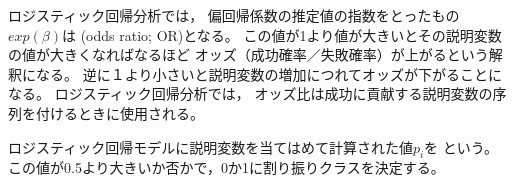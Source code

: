 {
  ロジスティック回帰分析では，
  偏回帰係数の推定値の指数をとったもの$exp(\beta)$は
  (odds ratio; OR)となる。
  この値が1より値が大きいとその説明変数の値が大きくなればなるほど
  オッズ（成功確率／失敗確率）が上がるという解釈になる。
  逆に１より小さいと説明変数の増加につれてオッズが下がることになる。
  ロジスティック回帰分析では，
  オッズ比は成功に貢献する説明変数の序列を付けるときに使用される。
}

{
  ロジスティック回帰モデルに説明変数を当てはめて計算された値$p_i$を
  という。
  この値が0.5より大きいか否かで，0か1に割り振りクラスを決定する。
}

\MyFrame{\insertsection}
{
}

\MyFrame{\insertsection}
{
}

\MyFrame{\insertsection}
{
}

\MyFrame{\insertsection}
{
}

\MyFrame{\insertsection}
{
}

\MyFrame{\insertsection}
{
}

\MyFrame{\insertsection}
{
}

\MyFrame{\insertsection}
{
}

\MyFrame{\insertsection}
{
}

\MyFrame{\insertsection}
{
}

\MyFrame{\insertsection}
{
}

\MyFrame{\insertsection}
{
}

\MyFrame{\insertsection}
{
}

\MyFrame{\insertsection}
{
}


